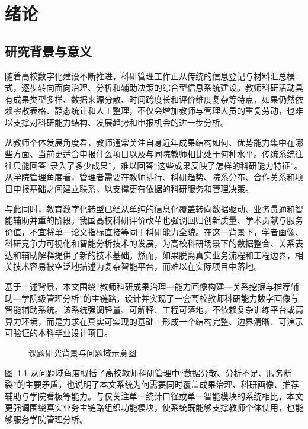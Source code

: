 \documentclass[12pt,a4paper]{ctexbook}
\begin{document}
\tableofcontents

\chapter{绪论}
\section{研究背景与意义}
随着高校数字化建设不断推进，科研管理工作正从传统的信息登记与材料汇总模式，逐步转向面向治理、分析和辅助决策的综合型信息系统建设。教师科研活动具有成果类型多样、数据来源分散、时间跨度长和评价维度复杂等特点，如果仍然依赖零散表格、静态统计和人工整理，不仅会增加教师与管理人员的重复劳动，也难以支撑对科研能力结构、发展趋势和申报机会的进一步分析。

从教师个体发展角度看，教师通常关注自身近年成果结构如何、优势能力集中在哪些方面、当前更适合申报什么项目以及与同院教师相比处于何种水平。传统系统往往只能回答“录入了多少成果”，难以回答“这些成果反映了怎样的科研能力特征”。从学院管理角度看，管理者需要在教师排行、科研趋势、院系分布、合作关系和项目申报基础之间建立联系，以支撑更有依据的科研服务和管理决策。

与此同时，教育数字化转型已经从单纯的信息化覆盖转向数据驱动、业务贯通和智能辅助并重的阶段\cite{edu_digitalization_2023}。我国高校科研评价改革也强调回归创新质量、学术贡献与服务价值，不宜将单一论文指标直接等同于科研能力全貌\cite{sci_policy_2020}。在这一背景下，学者画像、科研竞争力可视化和智能分析技术的发展，为高校科研场景下的数据整合、关系表达和辅助解释提供了新的技术基础\cite{scholar_visualization_2020}。然而，如果脱离真实业务流程和工程边界，相关技术容易被空泛地描述为复杂智能平台，而难以在实际项目中落地。

基于上述背景，本文围绕“教师科研成果治理—能力画像构建—关系挖掘与推荐辅助—学院级管理分析”的主链路，设计并实现了一套高校教师科研能力数字画像与智能辅助系统。该系统强调轻量、可解释、工程可落地，不依赖复杂训练平台或高算力环境，而是力求在真实可实现的基础上形成一个结构完整、边界清晰、可演示可验证的本科毕业设计项目。

\begin{figure}[H]
  \centering
  
  \caption{课题研究背景与问题域示意图}
  \label{fig:research-background}
\end{figure}

图~\ref{fig:research-background} 从问题域角度概括了高校教师科研管理中“数据分散、分析不足、服务断裂”的主要矛盾，也说明了本文系统为何需要同时覆盖成果治理、科研画像、推荐辅助与学院看板等能力。与仅关注单一统计口径或单一智能模块的系统相比，本文更强调围绕真实业务主链路组织功能模块，使系统既能够支撑教师个体使用，也能够服务学院管理分析。
\end{document}

